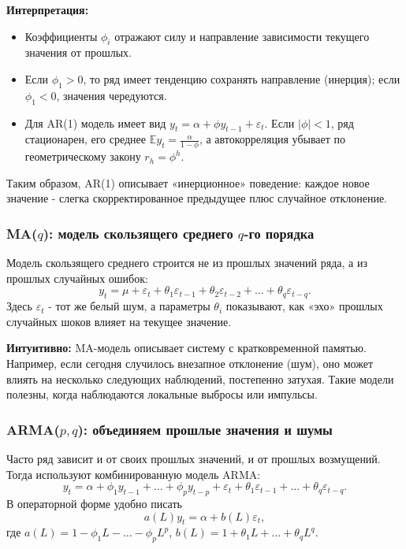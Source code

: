 \documentclass[12pt,a4paper]{article}
\begin{document}
\textbf{Интерпретация:}
\begin{itemize}
    \item Коэффициенты $\phi_i$ отражают силу и направление зависимости текущего значения от прошлых.
    \item Если $\phi_1>0$, то ряд имеет тенденцию сохранять направление (инерция); если $\phi_1<0$, значения чередуются.
    \item Для AR(1) модель имеет вид $y_t=\alpha+\phi y_{t-1}+\varepsilon_t$. Если $|\phi|<1$, ряд стационарен, его среднее $\mathbb{E}y_t=\frac{\alpha}{1-\phi}$, а автокорреляция убывает по геометрическому закону $r_h=\phi^h$.
\end{itemize}

Таким образом, AR(1) описывает «инерционное» поведение: каждое новое значение - слегка скорректированное предыдущее плюс случайное отклонение.

\subsubsection{MA($q$): модель скользящего среднего $q$-го порядка}

Модель скользящего среднего строится не из прошлых значений ряда, а из прошлых случайных ошибок:
\[
y_t = \mu + \varepsilon_t + \theta_1 \varepsilon_{t-1} + \theta_2 \varepsilon_{t-2} + \dots + \theta_q \varepsilon_{t-q}.
\]
Здесь $\varepsilon_t$ - тот же белый шум, а параметры $\theta_i$ показывают, как «эхо» прошлых случайных шоков влияет на текущее значение.

\textbf{Интуитивно:}
MA-модель описывает систему с кратковременной памятью. Например, если сегодня случилось внезапное отклонение (шум), оно может влиять на несколько следующих наблюдений, постепенно затухая. Такие модели полезны, когда наблюдаются локальные выбросы или импульсы.

\subsubsection{ARMA($p,q$): объединяем прошлые значения и шумы}

Часто ряд зависит и от своих прошлых значений, и от прошлых возмущений. Тогда используют комбинированную модель ARMA:
\[
y_t = \alpha + \phi_1 y_{t-1} + \dots + \phi_p y_{t-p}
      + \varepsilon_t + \theta_1 \varepsilon_{t-1} + \dots + \theta_q \varepsilon_{t-q}.
\]
В операторной форме удобно писать
\[
a(L) y_t = \alpha + b(L)\varepsilon_t,
\]
где $a(L)=1-\phi_1L-\dots-\phi_p L^p$, $b(L)=1+\theta_1L+\dots+\theta_qL^q$.
\end{document}
